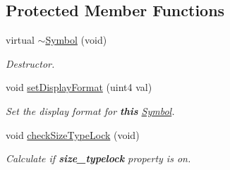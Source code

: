 \subsection*{Protected Member Functions}
\begin{DoxyCompactItemize}
\item 
virtual \mbox{\hyperlink{class_symbol_aaed4373bdbfb1cfea21a2b055da4b62b}{$\sim$\+Symbol}} (void)
\begin{DoxyCompactList}\small\item\em Destructor. \end{DoxyCompactList}\item 
void \mbox{\hyperlink{class_symbol_a13e0266010d85bcff19e91ee7404418b}{set\+Display\+Format}} (uint4 val)
\begin{DoxyCompactList}\small\item\em Set the display format for {\bfseries{this}} \mbox{\hyperlink{class_symbol}{Symbol}}. \end{DoxyCompactList}\item 
void \mbox{\hyperlink{class_symbol_a879a1fc513f5ffac31a0ed86a52c562c}{check\+Size\+Type\+Lock}} (void)
\begin{DoxyCompactList}\small\item\em Calculate if {\bfseries{size\+\_\+typelock}} property is on. \end{DoxyCompactList}\end{DoxyCompactItemize}
